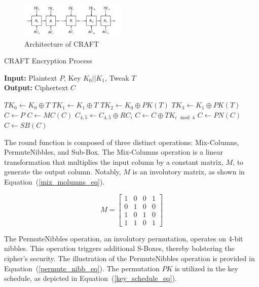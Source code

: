 \documentclass[final,5p,times,twocolumn]{elsarticle}
\begin{document}
\begin{figure}[h]%
    \centering
    \includegraphics[width=0.45\textwidth]{./struct-craft.pdf}
    \caption{Architecture of CRAFT}\label{fig1}
\end{figure}

\begin{algorithm}[h]
    \caption{CRAFT Encryption Process}\label{alg1}
    \textbf{Input:} Plaintext $P$, Key $K_0||K_1$, Tweak $T$ \\
    \textbf{Output:} Ciphertext $C$
    \begin{algorithmic}[1]
        \State $TK_0 \gets K_0\oplus T$
        \State $TK_1 \gets K_1\oplus T$
        \State $TK_2 \gets K_0\oplus PK(T)$
        \State $TK_3 \gets K_1\oplus PK(T)$
        \State $C \gets P$
        \State $C \gets MC(C)$
        \State $C_{4,5} \gets C_{4,5}\oplus RC_i$
        \State $C \gets C \oplus TK_{i\mod 4}$
        \State $C \gets PN(C)$
        \State $C \gets SB(C)$
        \EndIf
        \EndFor
    \end{algorithmic}
\end{algorithm}

The round function is composed of three distinct operations: Mix-Columns, PermuteNibbles, and Sub-Box.
The Mix-Columns operation is a linear transformation that multiplies the input column by a constant matrix, $M$, to generate the output column. Notably, $M$ is an involutory matrix, as shown in Equation~(\ref{mix_molumns_eq}).


\begin{equation}
    M =
    \begin{bmatrix}
        1 & 0 & 0 & 1 \\
        0 & 1 & 0 & 0 \\
        1 & 0 & 1 & 0 \\
        1 & 1 & 0 & 1
    \end{bmatrix}
    \label{mix_molumns_eq}
\end{equation}

The PermuteNibbles operation, an involutory permutation, operates on 4-bit nibbles. This operation triggers additional S-Boxes, thereby bolstering the cipher's security. The illustration of the PermuteNibbles operation is provided in Equation~(\ref{permute_nibb_eq}). The permutation $PK$ is utilized in the key schedule, as depicted in Equation~(\ref{key_schedule_eq}).
\end{document}
